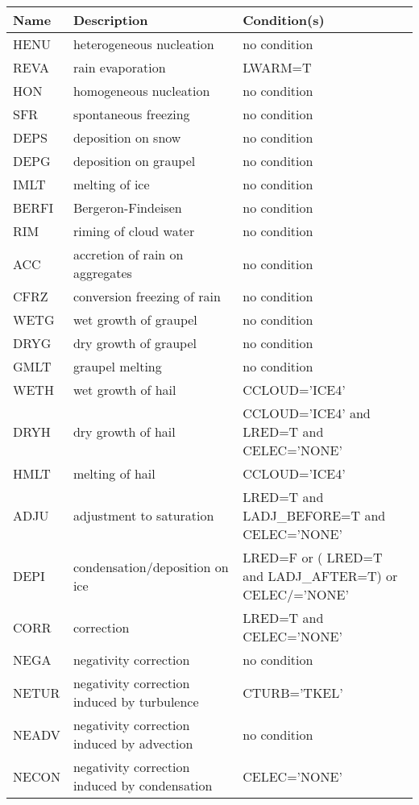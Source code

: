 \begin{longtable} {|p{}|p{}|p{}|}
\hline
Name & Description & Condition(s) \\
\hline \hline
\endhead
HENU   & heterogeneous nucleation                      & no condition \\\hline
REVA   & rain evaporation                              & LWARM=T \\\hline
HON    & homogeneous nucleation                        & no condition \\\hline
SFR    & spontaneous freezing                          & no condition \\\hline
DEPS   & deposition on snow                            & no condition \\\hline
DEPG   & deposition on graupel                         & no condition \\\hline
IMLT   & melting of ice                                & no condition \\\hline
BERFI  & Bergeron-Findeisen                            & no condition \\\hline
RIM    & riming of cloud water                         & no condition \\\hline
ACC    & accretion of rain on aggregates               & no condition \\\hline
CFRZ   & conversion freezing of rain                   & no condition \\\hline
WETG   & wet growth of graupel                         & no condition \\\hline
DRYG   & dry growth of graupel                         & no condition \\\hline
GMLT   & graupel melting                               & no condition \\\hline
WETH   & wet growth of hail                            & CCLOUD='ICE4' \\\hline
DRYH   & dry growth of hail                            & CCLOUD='ICE4' and LRED=T and CELEC='NONE' \\\hline
HMLT   & melting of hail                               & CCLOUD='ICE4' \\\hline
ADJU   & adjustment to saturation                      & LRED=T and LADJ\_BEFORE=T and CELEC='NONE' \\\hline
DEPI   & condensation/deposition on ice                & LRED=F or ( LRED=T and LADJ\_AFTER=T) or CELEC/='NONE' \\\hline
CORR   & correction                                    & LRED=T and CELEC='NONE' \\\hline
NEGA   & negativity correction                         & no condition \\\hline
NETUR  & negativity correction induced by turbulence   & CTURB='TKEL' \\\hline
NEADV  & negativity correction induced by advection    & no condition \\\hline
NECON  & negativity correction induced by condensation & CELEC='NONE' \\\hline
\end{longtable}

